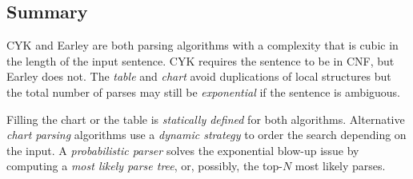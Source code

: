 \subsection{Summary}
CYK and Earley are both parsing algorithms with a complexity that is cubic in the length of the input sentence.
CYK requires the sentence to be in CNF, but Earley does not.
The \emph{table} and \emph{chart} avoid duplications of local structures but the total number of parses may still be \emph{exponential} if the sentence is ambiguous.

Filling the chart or the table is \emph{statically defined} for both algorithms.
Alternative \emph{chart parsing} algorithms use a \emph{dynamic strategy} to order the search depending on the input.
A \emph{probabilistic parser} solves the exponential blow-up issue by computing a \emph{most likely parse tree}, or, possibly, the top-\(N\) most likely parses.

